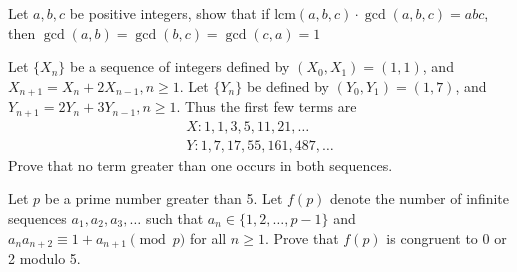 \begin{problem}
    Let $a,b,c$ be positive integers, show that if $\text{lcm}(a,b,c) \cdot \gcd (a,b,c) = abc$, then $\gcd(a,b) = \gcd(b,c) = \gcd(c,a) = 1$
\end{problem}

\begin{problem}[N][5][USAMO 1973/2]
    Let $\{ X_n \}$ be a sequence of integers defined by $(X_0, X_1) = (1,1)$, and $X_{n+1} = X_n + 2X_{n-1} , n \geq 1$. Let $\{Y_n\}$ be defined by $(Y_0, Y_1) = (1,7)$, and $Y_{n+1} = 2Y_n + 3Y_{n-1}, n \geq 1$. Thus the first few terms are
    \begin{align*}
        X : 1,1,3, 5, 11, 21, \ldots \\
        Y: 1, 7, 17, 55, 161, 487, \ldots
    \end{align*}
    Prove that no term greater than one occurs in both sequences.
\end{problem}




%
\begin{problem}[N][6][Putnam 2022/A3]
    Let \( p \) be a prime number greater than 5. Let \( f(p) \) denote the number of infinite sequences \( a_1, a_2, a_3, \dots \) such that  \( a_n \in \{1,2,\dots, p-1\} \) and  \( a_n a_{n+2} \equiv 1 + a_{n+1} \pmod{p} \) for all \( n \geq 1 \). Prove that \( f(p) \) is congruent to 0 or 2 modulo 5.
    \end{problem}

